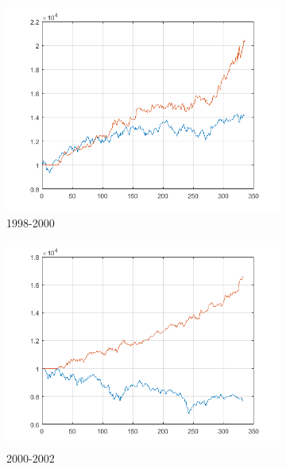 \documentclass[11pt,a4,twosided,singlespacing,titlepagenumber=on]{scrreprt}
\numberwithin{equation}{chapter} %
\theoremstyle{remark}
\begin{document}
\begin{figure}[H]
\begin{subfigure}[t]{0.32\textwidth}
        \includegraphics[width=1\textwidth]{res/backtest/5}
        \caption{1998-2000}
    \end{subfigure}
    \begin{subfigure}[t]{0.32\textwidth}
        \centering
        \includegraphics[width=1\textwidth]{res/backtest_cpx/6}
        \caption{2000-2002}
    \end{subfigure}
    \begin{subfigure}[t]{0.32\textwidth}
        \centering

\end{subfigure}
\end{figure}
\end{document}
